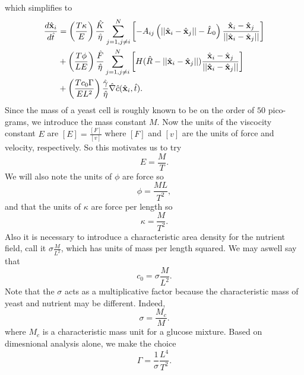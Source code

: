 which simplifies to 
\begin{equation*}
    \begin{split}
        \frac{d \hat{\vb{x}}_i}{d \hat{t}} &= 
        \left(\frac{T \kappa}{E }\right) \frac{\hat{K}}{\hat{\eta}}\sum_{j = 1, j \neq i}^N   \left[ - A_{ij} \left(||\hat{\vb{x}}_i - \hat{\vb{x}}_j|| - \hat{L}_0\right) \frac{\hat{\vb{x}}_i - \hat{\vb{x}}_j}{||\hat{\vb{x}}_i - \hat{\vb{x}}_j||} \right]\\
         &+ \left(\frac{T \phi}{L E}\right)\frac{\hat{F}}{\hat{\eta}}\sum_{j = 1, j \neq i}^N \left[H(\hat{R} - ||\hat{\vb{x}}_i - \hat{\vb{x}}_j||) \frac{\hat{\vb{x}}_i - \hat{\vb{x}}_j}{||\hat{\vb{x}}_i - \hat{\vb{x}}_j||}     \right]\\ 
         &+ \left(\frac{T c_0 \Gamma}{ E L^2} \right) \frac{\hat{\gamma}}{ \hat{\eta}}   \hat{\nabla}  \hat{c} (\hat{\vb{x}}_i, \hat{t}).
    \end{split}
\end{equation*}
Since the mass of a yeast cell is roughly known to be on the order of $50$ pico-grams, we
introduce the mass constant $M$. Now the units of the viscocity constant $E$ are $[E] = \frac{[F]}{[v]}$
where $[F]$ and $[v]$ are the units of force and velocity, respectively. So this motivates us to 
try 
\begin{equation*}
    E = \frac{M}{T}.
\end{equation*}
We will also note the units of $\phi$ are force so
\begin{equation*}
    \phi = \frac{ML}{T^2},
\end{equation*}
and that the units of $\kappa$ are force per length so
\begin{equation*}
    \kappa = \frac{M}{T^2}.
\end{equation*}
Also it is necessary to introduce a characteristic area density for the nutrient field,
call it $\sigma \frac{M}{L^2}$, which has units of mass per length squared. We may aswell say that 
\begin{equation}
    c_0 = \sigma \frac{M}{L^2}.
\end{equation}
Note that the $\sigma$ acts as a multiplicative factor because the characteristic mass of yeast
and nutrient may be different. Indeed,
\begin{equation}
     \sigma = \frac{M_c}{M}.
\end{equation}
where $M_c$ is a characteristic mass unit for a glucose mixture. Based on dimesnional 
analysis alone, we make the choice 
\begin{equation}
    \Gamma = \frac{1}{\sigma} \frac{L^4}{T^2}.
\end{equation}
